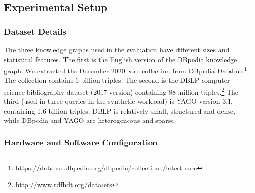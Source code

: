 \subsection{Experimental Setup}
\label{subsec:expsetup}

\vspace*{5pt}
\subsubsection{Dataset Details}

\vspace*{-7pt}
The three knowledge graphs used in the evaluation have
different sizes and statistical features.
The first is the English version of the DBpedia knowledge graph. We extracted the December 2020 core collection from DBpedia Databus.\footnote{\url{https://databus.dbpedia.org/dbpedia/collections/latest-core}} The collection contains 6 billion triples.
The second is the DBLP computer science bibliography dataset
(2017 version)
containing 88 million triples.\footnote{\url{http://www.rdfhdt.org/datasets}}
The third (used in three queries in the synthetic workload) is YAGO version 3.1, containing 1.6 billion triples.
DBLP is relatively small, structured and dense, while DBpedia and YAGO are heterogeneous and sparse.

\vspace*{3pt}
\subsubsection{Hardware and Software Configuration}

